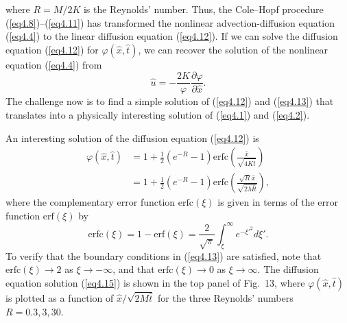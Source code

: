 \documentclass[10pt]{article}
\begin{document}
where $R=M/2K$ is the Reynolds' number.
Thus, the Cole--Hopf procedure (\ref{eq4.8})--(\ref{eq4.11}) has transformed
the nonlinear advection-diffusion
equation (\ref{eq4.4}) to the linear diffusion equation (\ref{eq4.12}). If we
can solve the diffusion equation (\ref{eq4.12}) for $\varphi(\hat{x},\hat{t})$,
we can recover the solution of the nonlinear equation (\ref{eq4.4}) from
\begin{equation}                                 %
     \hat{u} = -\frac{2K}{\varphi} \frac{\partial\varphi}{\partial\hat{x}}.
\label{eq4.14}
\end{equation}
The challenge now is to find a simple solution of (\ref{eq4.12}) and (\ref{eq4.13})
that translates into a physically interesting solution of (\ref{eq4.1}) and
(\ref{eq4.2}).

     An interesting solution of the diffusion equation (\ref{eq4.12}) is
\begin{equation}                                 %
  \begin{split}
     \varphi(\hat{x},\hat{t})
         &= 1 + \tfrac{1}{2}\left(e^{-R} - 1\right)
                        \text{erfc}\left(\frac{\hat{x}}{\sqrt{4K\hat{t}}}\right) \\
	 &= 1 + \tfrac{1}{2}\left(e^{-R} - 1\right)
                        \text{erfc}\left(\frac{\sqrt{R}\hat{x}}{\sqrt{2M\hat{t}}}\right),
  \end{split}
\label{eq4.15}
\end{equation}
where the complementary error function $\text{erfc}(\xi)$ is given in terms of the
error function $\text{erf}(\xi)$ by
\begin{equation}                                %
    \text{erfc}(\xi) = 1 - \text{erf}(\xi)
                     = \frac{2}{\sqrt{\pi}}\int_\xi^\infty e^{-\xi'^2} d\xi'.
\label{eq4.16}
\end{equation}
To verify that the boundary conditions in (\ref{eq4.13}) are satisfied, note that
$\text{erfc}(\xi) \to 2$ as $\xi \to -\infty$, and that $\text{erfc}(\xi) \to 0$
as $\xi \to  \infty$. The diffusion equation solution (\ref{eq4.15}) is shown in
the top panel of Fig.~13, where $\varphi(\hat{x},\hat{t})$ is plotted as a function of
$\hat{x}/\sqrt{2M\hat{t}}$ for the three Reynolds' numbers $R=0.3,3,30$.
\end{document}
